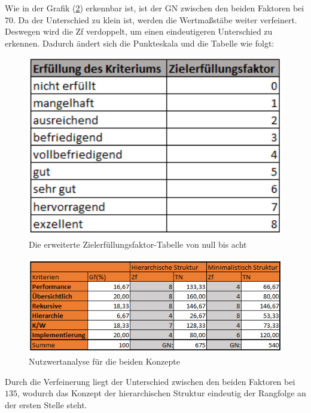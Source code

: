 Wie in der Grafik (\ref{fig:Nutz}) erkennbar ist, ist der \ac{GN} zwischen den beiden Faktoren bei $70$.
Da der Unterschied zu klein ist, werden die Wertmaßstäbe weiter verfeinert.
Deswegen wird die \ac{Zf} verdoppelt, um einen eindeutigeren Unterschied zu erkennen.
Dadurch ändert sich die Punkteskala und die Tabelle wie folgt:
\begin{figure}[h!]
 \centering
 \includegraphics[width=1\textwidth]{gfx/Picture/Ziel2.PNG}
 \caption{Die erweiterte Zielerfüllungsfaktor-Tabelle von null bis acht}
 \label{fig:Ziel}
\end{figure}
\newpage
\begin{figure}[h!]
 \centering
 \includegraphics[width=1\textwidth]{gfx/Picture/Nutzwert2.PNG}
 \caption{Nutzwertanalyse für die beiden Konzepte}
 \label{fig:Nutz}
\end{figure}
Durch die Verfeinerung liegt der Unterschied zwischen den beiden Faktoren bei $135$, wodurch das Konzept der hierarchischen Struktur eindeutig der Rangfolge an der ersten Stelle steht.

